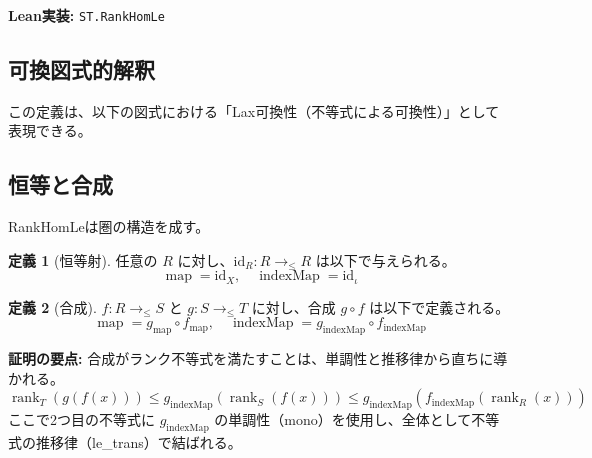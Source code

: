 \documentclass[a4paper,11pt]{article}
\theoremstyle{definition}
\newtheorem{definition}{定義}[section]
\theoremstyle{plain}
\newcommand{\code}[1]{\texttt{#1}}
\newcommand{\rank}{\operatorname{rank}}
\newcommand{\map}{\operatorname{map}}
\newcommand{\indexMap}{\operatorname{indexMap}}
\begin{document}
\noindent \textbf{Lean実装:} \code{ST.RankHomLe}

\subsection{可換図式的解釈}
この定義は、以下の図式における「Lax可換性（不等式による可換性）」として表現できる。

\begin{center}
\end{center}

\subsection{恒等と合成}
RankHomLeは圏の構造を成す。

\begin{definition}[恒等射]
任意の $R$ に対し、$\mathrm{id}_R : R \to_{\le} R$ は以下で与えられる。
\[ \map = \mathrm{id}_X, \quad \indexMap = \mathrm{id}_\iota \]
\end{definition}

\begin{definition}[合成]
$f : R \to_{\le} S$ と $g : S \to_{\le} T$ に対し、合成 $g \circ f$ は以下で定義される。
\[ \map = g_{\map} \circ f_{\map}, \quad \indexMap = g_{\indexMap} \circ f_{\indexMap} \]
\end{definition}

\noindent \textbf{証明の要点:} 合成がランク不等式を満たすことは、単調性と推移律から直ちに導かれる。
\[
  \rank_T(g(f(x))) \le g_{\indexMap}(\rank_S(f(x))) \le g_{\indexMap}(f_{\indexMap}(\rank_R(x)))
\]
ここで2つ目の不等式に $g_{\indexMap}$ の単調性（mono）を使用し、全体として不等式の推移律（le\_trans）で結ばれる。
\end{document}
